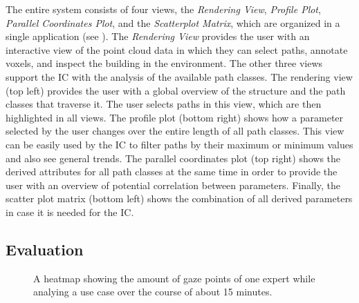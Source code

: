 The entire system consists of four views, the \emph{Rendering View}, \emph{Profile Plot}, \emph{Parallel Coordinates Plot}, and the \emph{Scatterplot Matrix}, which are organized in a single application (see ).  The \emph{Rendering View} provides the user with an interactive view of the point cloud data in which they can select paths, annotate voxels, and inspect the building in the  environment.  The other three views support the IC with the analysis of the available path classes.  The rendering view (top left) provides the user with a global overview of the structure and the path classes that traverse it.  The user selects paths in this view, which are then highlighted in all views.  The profile plot (bottom right) shows how a parameter selected by the user changes over the entire length of all path classes.  This view can be easily used by the IC to filter paths by their maximum or minimum values and also see general trends.  The parallel coordinates plot (top right) shows the derived attributes for all path classes at the same time in order to provide the user with an overview of potential correlation between parameters.  Finally, the scatter plot matrix (bottom left) shows the combination of all derived parameters in case it is needed for the IC.


\subsection{Evaluation} \label{contributions:usar:evaluation}
\begin{figure}
\caption{A heatmap showing the amount of gaze points of one expert while analying a use case over the course of about 15 minutes.}
\label{contributions:usar:system:heatmap}
\end{figure}

